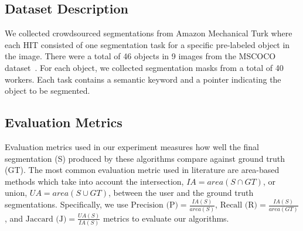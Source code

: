 \subsection{Dataset Description}
We collected crowdsourced segmentations from Amazon Mechanical Turk where each HIT consisted of one segmentation task for a specific pre-labeled object in the image. There were a total of 46 objects in 9 images from the MSCOCO dataset~\cite{Lin2014}. For each object, we collected segmentation masks from a total of 40 workers. Each task contains a semantic keyword and a pointer indicating the object to be segmented. %
\subsection{Evaluation Metrics}
\par Evaluation metrics used in our experiment measures how well the final segmentation (S) produced by these algorithms compare against ground truth (GT). The most common evaluation metric used in literature are area-based methods which take into account the intersection, $IA=area(S\cap GT)$, or union, $UA=area(S\cup GT)$, between the user and the ground truth segmentations. Specifically, we use
    $\text{Precision (P)} = \frac{IA(S)}{area(S)}$, 
    $\text{Recall (R)} = \frac{IA(S)}{area(GT)}$, and 
    $\text{Jaccard (J)} = \frac{UA(S)}{IA(S)}$
    metrics to evaluate our algorithms.
